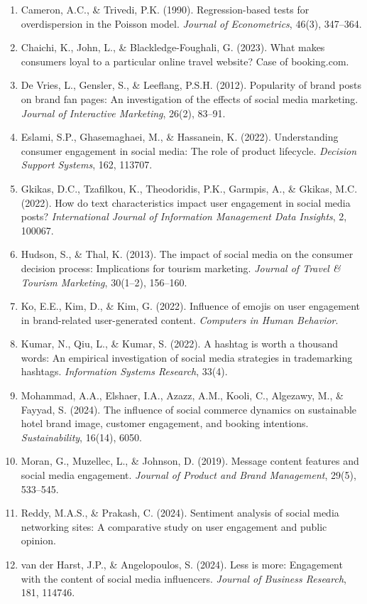 \documentclass[12pt,a4paper]{ctexart}
\begin{document}
\begin{enumerate}
    \item Cameron, A.C., \& Trivedi, P.K. (1990). Regression-based tests for overdispersion in the Poisson model. \textit{Journal of Econometrics}, 46(3), 347--364.
    \item Chaichi, K., John, L., \& Blackledge-Foughali, G. (2023). What makes consumers loyal to a particular online travel website? Case of booking.com.
    \item De Vries, L., Gensler, S., \& Leeflang, P.S.H. (2012). Popularity of brand posts on brand fan pages: An investigation of the effects of social media marketing. \textit{Journal of Interactive Marketing}, 26(2), 83--91.
    \item Eslami, S.P., Ghasemaghaei, M., \& Hassanein, K. (2022). Understanding consumer engagement in social media: The role of product lifecycle. \textit{Decision Support Systems}, 162, 113707.
    \item Gkikas, D.C., Tzafilkou, K., Theodoridis, P.K., Garmpis, A., \& Gkikas, M.C. (2022). How do text characteristics impact user engagement in social media posts? \textit{International Journal of Information Management Data Insights}, 2, 100067.
    \item Hudson, S., \& Thal, K. (2013). The impact of social media on the consumer decision process: Implications for tourism marketing. \textit{Journal of Travel \& Tourism Marketing}, 30(1--2), 156--160.
    \item Ko, E.E., Kim, D., \& Kim, G. (2022). Influence of emojis on user engagement in brand-related user-generated content. \textit{Computers in Human Behavior}.
    \item Kumar, N., Qiu, L., \& Kumar, S. (2022). A hashtag is worth a thousand words: An empirical investigation of social media strategies in trademarking hashtags. \textit{Information Systems Research}, 33(4).
    \item Mohammad, A.A., Elshaer, I.A., Azazz, A.M., Kooli, C., Algezawy, M., \& Fayyad, S. (2024). The influence of social commerce dynamics on sustainable hotel brand image, customer engagement, and booking intentions. \textit{Sustainability}, 16(14), 6050.
    \item Moran, G., Muzellec, L., \& Johnson, D. (2019). Message content features and social media engagement. \textit{Journal of Product and Brand Management}, 29(5), 533--545.
    \item Reddy, M.A.S., \& Prakash, C. (2024). Sentiment analysis of social media networking sites: A comparative study on user engagement and public opinion.
    \item van der Harst, J.P., \& Angelopoulos, S. (2024). Less is more: Engagement with the content of social media influencers. \textit{Journal of Business Research}, 181, 114746.
\end{enumerate}
\end{document}
